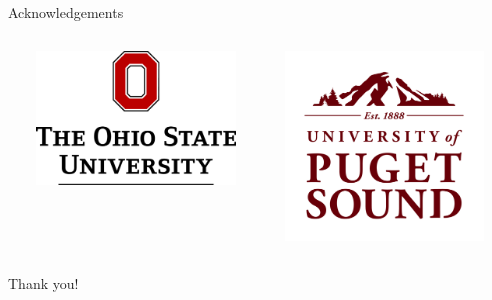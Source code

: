 \begin{frame}{Acknowledgements}
\begin{columns}[T,onlytextwidth]
\begin{minipage}[]{0.225\textwidth}
\end{minipage}%
\begin{minipage}[]{0.025\textwidth}
~
\end{minipage}%
\begin{minipage}[]{0.225\textwidth}
    \includegraphics[width = \textwidth]{images/OSU_Stacked_ScarletBlack}
\end{minipage}%
\begin{minipage}[]{0.025\textwidth}
~
\end{minipage}%
\begin{minipage}[]{0.225\textwidth}
    \includegraphics[width = \textwidth]{images/UofPS_stacked_maroonRGB_PNG}
\end{minipage}%
\begin{minipage}[]{0.0125\textwidth}
~
\end{minipage}%
\end{columns}
\end{frame}

\begin{frame}[standout]
  Thank you!
\end{frame}